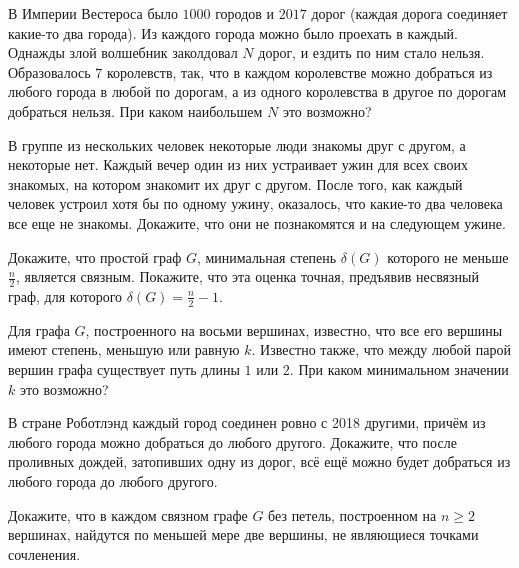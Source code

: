 \begin{exersize}
	В Империи Вестероса было $1000$ городов и $2017$ дорог (каждая дорога соединяет какие-то два города). Из каждого города можно 
	было проехать в каждый. Однажды злой волшебник заколдовал $N$ дорог, и ездить по ним стало нельзя. Образовалось $7$ королевств, 
	так, что в каждом королевстве можно добраться из любого города в любой по дорогам, а из одного королевства в другое по дорогам 
	добраться нельзя. При каком наибольшем $N$ это возможно?
\end{exersize}

\begin{exersize}
	В группе из нескольких человек некоторые люди знакомы друг с другом, а некоторые нет. Каждый вечер один из них устраивает 
	ужин для всех своих знакомых, на котором знакомит их друг с другом. После того, как каждый человек устроил хотя бы по одному ужину, 
	оказалось, что какие-то два человека все еще не знакомы. Докажите, что они не познакомятся и на следующем ужине.
\end{exersize}

\begin{exersize}
	Докажите, что простой граф $G$, минимальная степень $\delta (G)$ которого не меньше $\frac{n}{2}$, является связным. 
	Покажите, что эта оценка точная, предъявив несвязный граф, для которого $\delta (G) = \frac{n}{2} - 1$.
\end{exersize}

\begin{exersize} 
	Для графа $G$, построенного на восьми вершинах, известно, что все его вершины
	имеют степень, меньшую или равную $k$. Известно также, что между любой парой
	вершин графа существует путь длины $1$ или $2$. 
	При каком минимальном значении $k$ это возможно?
\end{exersize}

\begin{exersize}
	В стране Роботлэнд каждый город соединен ровно с 2018 другими, причём из любого города можно добраться до любого другого. 
	Докажите, что после проливных дождей, затопивших одну из дорог, всё ещё можно будет добраться из любого города до любого другого.
\end{exersize}

\begin{exersize} 
	Докажите, что в каждом связном графе $G$ без петель, построенном 
	на $n \geqslant 2$ вершинах, найдутся по меньшей мере две вершины,
	не являющиеся точками сочленения.
\end{exersize}

